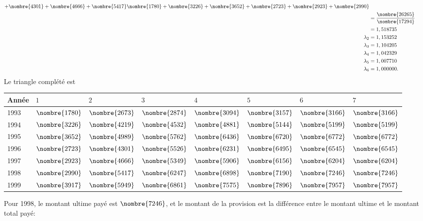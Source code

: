 \begin{exercice}
\begin{sol}
\begin{enumerate}
\begin{align*}
{                    +\nombre{4301} + \nombre{4666} + \nombre{5417}}{\nombre{1780} +
                    \nombre{3226} + \nombre{3652} + \nombre{2723} + \nombre{2923} + \nombre{2990}}\\
                  &=  \frac{\nombre{26265}}{\nombre{17294}}\\
                  &= 1,518735\\
        \lambda_2 &=  1,153252\\
        \lambda_3 &= 1,104205\\
        \lambda_4 &=  1,042329\\
        \lambda_5 &= 1,007710\\
        \lambda_6 &= 1,000000.
      \end{align*}
      Le triangle complété est
      \begin{center}
        \begin{tabular}{|l|l l l l l l l|}\hline
          Année & $1$ & $2$ & $3$ & $4$ & $5$ & $6$ & $7$\\ \hline
          1993& $\nombre{1780}$& $\nombre{2673}$& $\nombre{2874}$& $\nombre{3094}$& $\nombre{3157}$& $\nombre{3166}$& $\nombre{3166}$ \\
          1994& $\nombre{3226}$& $\nombre{4219}$& $\nombre{4532}$& $\nombre{4881}$& $\nombre{5144}$& $\nombre{5199}$& $\nombre{5199}$ \\
          1995& $\nombre{3652}$& $\nombre{4989}$& $\nombre{5762}$& $\nombre{6436}$& $\nombre{6720}$& $\nombre{6772}$& $\nombre{6772}$ \\
          1996& $\nombre{2723}$& $\nombre{4301}$& $\nombre{5526}$& $\nombre{6231}$& $\nombre{6495}$& $\nombre{6545}$& $\nombre{6545}$ \\
          1997& $\nombre{2923}$& $\nombre{4666}$& $\nombre{5349}$& $\nombre{5906}$& $\nombre{6156}$& $\nombre{6204}$& $\nombre{6204}$ \\
          1998& $\nombre{2990}$& $\nombre{5417}$& $\nombre{6247}$& $\nombre{6898}$& $\nombre{7190}$& $\nombre{7246}$& $\nombre{7246}$ \\
          1999& $\nombre{3917}$& $\nombre{5949}$& $\nombre{6861}$& $\nombre{7575}$& $\nombre{7896}$& $\nombre{7957}$& $\nombre{7957}$\\\hline
        \end{tabular}
      \end{center}
      Pour 1998, le montant ultime payé est $\nombre{7246}$, et le
      montant de la provision est la différence entre le montant ultime
      et le montant total payé:

\end{enumerate}
\end{sol}
\end{exercice}
